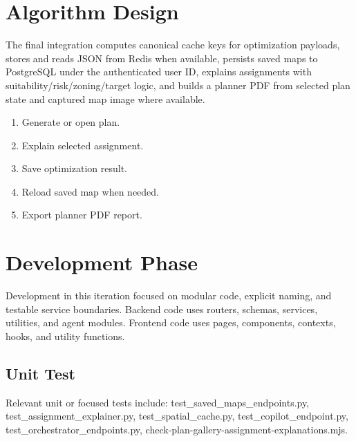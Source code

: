 \documentclass[12pt,a4paper,oneside]{report}
\begin{document}
\section{Algorithm Design}
The final integration computes canonical cache keys for optimization payloads, stores and reads JSON from Redis when available, persists saved maps to PostgreSQL under the authenticated user ID, explains assignments with suitability/risk/zoning/target logic, and builds a planner PDF from selected plan state and captured map image where available.
\begin{enumerate}

\item Generate or open plan.

\item Explain selected assignment.

\item Save optimization result.

\item Reload saved map when needed.

\item Export planner PDF report.

\end{enumerate}

\section{Development Phase}
Development in this iteration focused on modular code, explicit naming, and testable service boundaries. Backend code uses routers, schemas, services, utilities, and agent modules. Frontend code uses pages, components, contexts, hooks, and utility functions.

\subsection{Unit Test}
Relevant unit or focused tests include: test\_saved\_maps\_endpoints.py, test\_assignment\_explainer.py, test\_spatial\_cache.py, test\_copilot\_endpoint.py, test\_orchestrator\_endpoints.py, check-plan-gallery-assignment-explanations.mjs.
\end{document}
